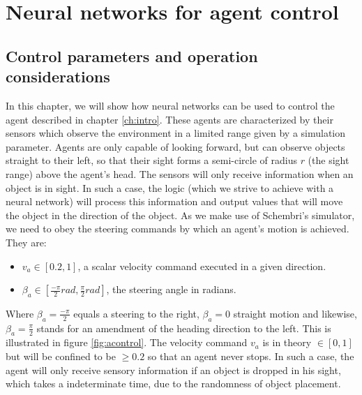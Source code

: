 \documentclass[10pt,a4paper,DIV=11]{scrreprt}
\begin{document}
\chapter{Neural networks for agent control}
\label{ch:design}

\section{Control parameters and operation considerations}
In this chapter, we will show how neural networks can be used to control the agent described in chapter \ref{ch:intro}. These agents are 
characterized by their sensors which observe the environment in a limited range given by a simulation parameter. Agents are only capable 
of looking forward, but can observe objects straight to their left, so that their sight forms a semi-circle of radius $r$ (the sight range) above 
the agent's head. The sensors will only receive information when an object is in sight. In such a case, the logic (which we strive to achieve with 
a neural network) will process this information and output values that will move the object in the direction of the object. As we make use
of Schembri's simulator, we need to obey the steering commands by which an agent's motion is achieved. They are:

\begin{itemize}
    \item $v_a \in [0.2,1]$, a scalar velocity command executed in a given direction.
    \item $\beta_a \in [\frac{-\pi}{2} rad, \frac{\pi}{2} rad]$, the steering angle in radians.
\end{itemize}

Where $\beta_a = \frac{-\pi}{2}$ equals a steering to the right, $\beta_a = 0$ straight motion and likewise, $\beta_a = \frac{\pi}{2}$ stands for 
an amendment of the heading direction to the left. This is illustrated in figure \ref{fig:acontrol}. The velocity command $v_a$ is in 
theory $ \in [0,1]$ but will be confined to be $\geq 0.2$ so that an agent never stops. In such a case, the agent will only receive sensory 
information if an object is dropped in his sight, which takes a indeterminate time, due to the randomness of object placement.
\end{document}
